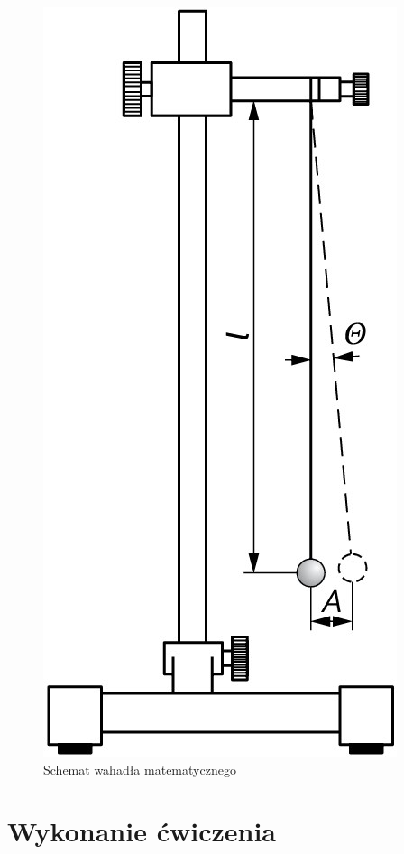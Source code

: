 \documentclass[a4paper,12pts]{article}
\begin{document}
		\begin{figure}[!h]
			\centering
			\includegraphics[scale=0.12]{wah.png}
			\caption{Schemat wahadła matematycznego}
			\label{wahadlo}
		\end{figure}
	
	
	\section{Wykonanie ćwiczenia}
	
\end{document}
